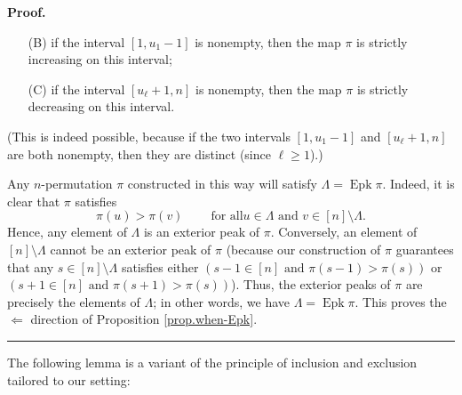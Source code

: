 \documentclass[numbers=enddot,12pt,final,onecolumn,notitlepage]{scrartcl}%
\theoremstyle{definition}
\newenvironment{proof}[1][Proof]{\noindent\textbf{#1.} }{\ \rule{0.5em}{0.5em}}
\newenvironment{verlong}{}{}
\begin{document}
\begin{verlong}
\begin{proof}
\begin{itemize}
\begin{itemize}
\item[(B)] if the interval $\left[  1,u_{1}-1\right]  $ is nonempty, then the
map $\pi$ is strictly increasing on this interval;

\item[(C)] if the interval $\left[  u_{\ell}+1,n\right]  $ is nonempty, then
the map $\pi$ is strictly decreasing on this interval.
\end{itemize}

(This is indeed possible, because if the two intervals $\left[  1,u_{1}%
-1\right]  $ and $\left[  u_{\ell}+1,n\right]  $ are both nonempty, then they
are distinct (since $\ell\geq1$).)
\end{itemize}

Any $n$-permutation $\pi$ constructed in this way will satisfy $\Lambda
=\operatorname*{Epk}\pi$. Indeed, it is clear that $\pi$ satisfies%
\[
\pi\left(  u\right)  >\pi\left(  v\right)  \ \ \ \ \ \ \ \ \ \ \text{for all
}u\in\Lambda\text{ and }v\in\left[  n\right]  \setminus\Lambda.
\]
Hence, any element of $\Lambda$ is an exterior peak of $\pi$. Conversely, an
element of $\left[  n\right]  \setminus\Lambda$ cannot be an exterior peak of
$\pi$ (because our construction of $\pi$ guarantees that any $s\in\left[
n\right]  \setminus\Lambda$ satisfies either $\left(  s-1\in\left[  n\right]
\text{ and }\pi\left(  s-1\right)  >\pi\left(  s\right)  \right)  $ or
$\left(  s+1\in\left[  n\right]  \text{ and }\pi\left(  s+1\right)
>\pi\left(  s\right)  \right)  $). Thus, the exterior peaks of $\pi$ are
precisely the elements of $\Lambda$; in other words, we have $\Lambda
=\operatorname*{Epk}\pi$. This proves the $\Longleftarrow$ direction of
Proposition \ref{prop.when-Epk}.
\end{proof}
\end{verlong}

The following lemma is a variant of the principle of inclusion and exclusion
tailored to our setting:
\end{document}
